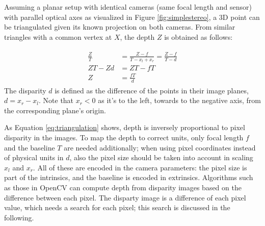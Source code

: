
Assuming a planar setup with identical cameras (same focal length and sensor) with parallel optical axes as visualized in Figure \ref{fig:simplestereo}, a 3D point can be triangulated given its known projection on both cameras.
From similar triangles with a common vertex at $X$, the depth $Z$ is obtained as follows:

\begin{align} \label{eq:triangulation} \begin{split}
	\frac{Z}{T} &= \frac{Z-f}{T - x_l + x_r} = \frac{Z-f}{T - d}\\
	ZT - Zd &= ZT - fT\\
	Z &= \frac{fT}{d}
\end{split} \end{align}
The disparity $d$ is defined as the difference of the points in their image planes, $d = x_r - x_l$.
Note that $x_r < 0$ as it's to the left, towards to the negative axis, from the corresponding plane's origin.

As Equation \ref{eq:triangulation} shows, depth is inversely proportional to pixel disparity in the images.
To map the depth to correct units, only focal length $f$ and the baseline $T$ are needed additionally; when using pixel coordinates instead of physical units in $d$, also the pixel size should be taken into account in scaling $x_l$ and $x_r$.
All of these are encoded in the camera parameters: the pixel size is part of the intrinsics, and the baseline is encoded in extrinsics.
Algorithms such as those in OpenCV \cite{opencv} can compute depth from disparity images based on the difference between each pixel.
The disparty image is a difference of each pixel value, which needs a search for each pixel;
this search is discussed in the following.

